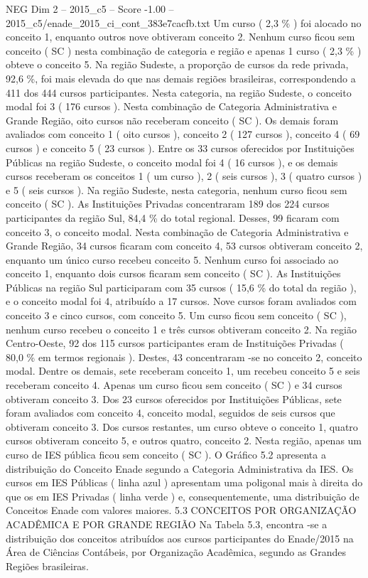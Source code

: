 \begin{textsample}{NEG Dim 2 – 2015\_c5 – Score -1.00 – 2015\_c5/enade\_2015\_ci\_cont\_383e7cacfb.txt}
Um curso ( 2,3 \% ) foi alocado no conceito 1, enquanto outros nove obtiveram conceito 2.
Nenhum curso ficou sem conceito ( SC ) nesta combinação de categoria e região e apenas 1 curso ( 2,3 \% ) obteve o conceito 5.
Na região Sudeste, a proporção de cursos da rede privada, 92,6 \%, foi mais elevada do que nas demais regiões brasileiras, correspondendo a 411 dos 444 cursos participantes.
Nesta categoria, na região Sudeste, o conceito modal foi 3 ( 176 cursos ).
Nesta combinação de Categoria Administrativa e Grande Região, oito cursos não receberam conceito ( SC ).
Os demais foram avaliados com conceito 1 ( oito cursos ), conceito 2 ( 127 cursos ), conceito 4 ( 69 cursos ) e conceito 5 ( 23 cursos ).
Entre os 33 cursos oferecidos por Instituições Públicas na região Sudeste, o conceito modal foi 4 ( 16 cursos ), e os demais cursos receberam os conceitos 1 ( um curso ), 2 ( seis cursos ), 3 ( quatro cursos ) e 5 ( seis cursos ).
Na região Sudeste, nesta categoria, nenhum curso ficou sem conceito ( SC ).
As Instituições Privadas concentraram 189 dos 224 cursos participantes da região Sul, 84,4 \% do total regional.
Desses, 99 ficaram com conceito 3, o conceito modal.
Nesta combinação de Categoria Administrativa e Grande Região, 34 cursos ficaram com conceito 4, 53 cursos obtiveram conceito 2, enquanto um único curso recebeu conceito 5.
Nenhum curso foi associado ao conceito 1, enquanto dois cursos ficaram sem conceito ( SC ).
As Instituições Públicas na região Sul participaram com 35 cursos ( 15,6 \% do total da região ), e o conceito modal foi 4, atribuído a 17 cursos.
Nove cursos foram avaliados com conceito 3 e cinco cursos, com conceito 5.
Um curso ficou sem conceito ( SC ), nenhum curso recebeu o conceito 1 e três cursos obtiveram conceito 2.
Na região Centro-Oeste, 92 dos 115 cursos participantes eram de Instituições Privadas ( 80,0 \% em termos regionais ).
Destes, 43 concentraram -se no conceito 2, conceito modal.
Dentre os demais, sete receberam conceito 1, um recebeu conceito 5 e seis receberam conceito 4.
Apenas um curso ficou sem conceito ( SC ) e 34 cursos obtiveram conceito 3.
Dos 23 cursos oferecidos por Instituições Públicas, sete foram avaliados com conceito 4, conceito modal, seguidos de seis cursos que obtiveram conceito 3.
Dos cursos restantes, um curso obteve o conceito 1, quatro cursos obtiveram conceito 5, e outros quatro, conceito 2.
Nesta região, apenas um curso de IES pública ficou sem conceito ( SC ).
O Gráfico 5.2 apresenta a distribuição do Conceito Enade segundo a Categoria Administrativa da IES.
Os cursos em IES Públicas ( linha azul ) apresentam uma poligonal mais à direita do que os em IES Privadas ( linha verde ) e, consequentemente, uma distribuição de Conceitos Enade com valores maiores. 5.3 CONCEITOS POR ORGANIZAÇÃO ACADÊMICA E POR GRANDE REGIÃO Na Tabela 5.3, encontra -se a distribuição dos conceitos atribuídos aos cursos participantes do Enade/2015 na Área de Ciências Contábeis, por Organização Acadêmica, segundo as Grandes Regiões brasileiras.

\end{textsample}
